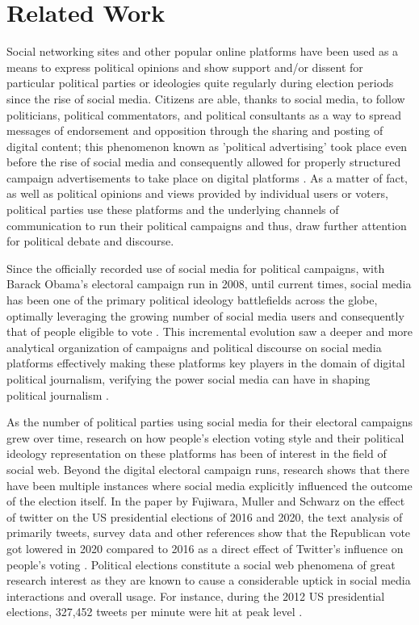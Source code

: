 \section{Related Work}

Social networking sites and other popular online platforms have been used as a means to express political opinions and show support and/or dissent for particular political parties or ideologies quite regularly during election periods since the rise of social media. Citizens are able, thanks to social media, to follow politicians, political commentators, and political consultants as a way to spread messages of endorsement and opposition through the sharing and posting of digital content; this phenomenon known as 'political advertising' took place even before the rise of social media and consequently allowed for properly structured campaign advertisements to take place on digital platforms \cite{website}.
As a matter of fact, as well as political opinions and views provided by individual users or voters, political parties use these platforms and the underlying channels of communication to run their political campaigns and thus, draw further attention for political debate and discourse. 

Since the officially recorded use of social media for political campaigns, with Barack Obama's electoral campaign run in 2008, until current times, social media has been one of the primary political ideology battlefields across the globe, optimally leveraging the growing number of social media users and consequently that of people eligible to vote \cite{socialmediasociety} . 
This incremental evolution saw a deeper and more analytical organization of campaigns and political discourse on social media platforms effectively making these platforms key players in the domain of digital political journalism, verifying the power social media can have in shaping political journalism \cite{kreiss}. 

As the number of political parties using social media for their electoral campaigns grew over time, research on how people's election voting style and their political ideology representation on these platforms has been of interest in the field of social web. Beyond the digital electoral campaign runs, research shows that there have been multiple instances where social media explicitly influenced the outcome of the election itself. In the paper by Fujiwara, Muller and Schwarz on the effect of twitter on the US presidential elections of 2016 and 2020, the text analysis of primarily tweets, survey data and other references show that the Republican vote got lowered in 2020 compared to 2016 as a direct effect of Twitter's influence on people's voting \cite{socialmediaelections}.
Political elections constitute a social web phenomena of great research interest as they are known to cause a considerable uptick in social media interactions and overall usage. For instance, during the 2012 US presidential elections, 327,452 tweets per minute were hit at peak level \cite{slide}.

